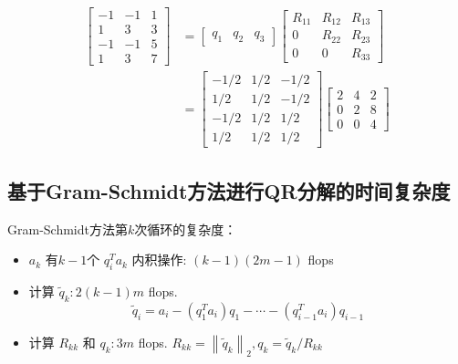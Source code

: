 \begin{example}
\begin{equation}
\begin{aligned}
\left[\begin{array}{rrr}
-1 & -1 & 1 \\
1 & 3 & 3 \\
-1 & -1 & 5 \\
1 & 3 & 7
\end{array}\right] &=\left[\begin{array}{lll}
q_{1} & q_{2} & q_{3}
\end{array}\right]\left[\begin{array}{ccc}
R_{11} & R_{12} & R_{13} \\
0 & R_{22} & R_{23} \\
0 & 0 & R_{33}
\end{array}\right] \\
&=\left[\begin{array}{rrr}
-1 / 2 & 1 / 2 & -1 / 2 \\
1 / 2 & 1 / 2 & -1 / 2 \\
-1 / 2 & 1 / 2 & 1 / 2 \\
1 / 2 & 1 / 2 & 1 / 2
\end{array}\right]\left[\begin{array}{rrr}
2 & 4 & 2 \\
0 & 2 & 8 \\
0 & 0 & 4
\end{array}\right]
\end{aligned}
\end{equation}
\end{example}

\subsection{基于Gram-Schmidt方法进行QR分解的时间复杂度}
\label{complexity:gram-schmidt-qr}

Gram-Schmidt方法第$k$次循环的复杂度：

\begin{itemize}
    \item $ a_{k} $ 有$k-1$个 $ q_{i}^{T} a_{k} $ 内积操作: $ ( {k}-1)(2  {m}-1) $ flops
    \item 计算 $ \tilde{q}_{k}: 2( {k}-1)  {m} $ flops. \begin{equation} \tilde{q}_{i}=a_{i}-\left(q_{1}^{T} a_{i}\right) q_{1}-\cdots-\left(q_{i-1}^{T} a_{i}\right) q_{i-1} \end{equation}
    \item 计算 $ R_{k k} $ 和 $ q_{k}: 3  {m} $ flops. $  R_{k k}=\left\|\tilde{q}_{k}\right\|_{2}, q_{k}=\tilde{q}_{k} / R_{k k} $
\end{itemize}

